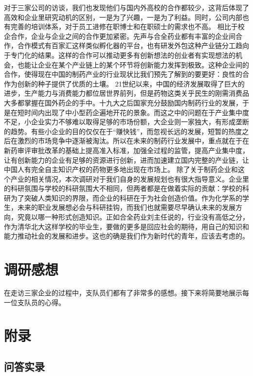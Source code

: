 \documentclass[twocolumn,openany]{ctexbook}
\begin{document}
	对于三家公司的访谈，我们也发现他们与国内外高校的合作都较少，这背后体现了高效和企业里研究动机的区别，一是为了兴趣，一是为了利益。同时，公司内部也有完善的培训体系，对于员工进修在职博士和在职硕士的需求也不高。
	相比于校企合作，企业与企业之间的合作更加紧密。先声与合全药业都有丰富的企业间合作，合作模式有百家汇这样类似孵化器的平台，也有研发外包这种产业链分工趋向于专门化的结果。这样的合作可以推动更多有创新想法的创业者有实现想法的机会，也能让企业在某个产业链上的某个环节将创新能力发挥到极致。这种企业间的合作，使得现在中国的制药产业的行业现状比我们预先了解到的要更好：良性的合作为创新的种子提供了优质的土壤。
	21世纪以来，中国的经济发展取得了巨大的进步，生产能力与消费能力都位居世界前列\citep{RN38}，但是药物这类关乎民生的刚需消费品大多都掌握在国外药企的手中。十九大之后国家充分鼓励国内制药行业的发展\citep{RN38}，于是在短时间内出现了中小型药企遍地开花的景象。而这之中的问题在于产业集中度不足，小企业实力不够难以取得足够的市场份额，大企业则一家独大，有形成垄断的趋势。有些小企业的目的仅仅在于“赚快钱”，而忽视长远的发展，短暂的热度之后在激烈的市场竞争中逐渐被淘汰。所以在未来的制药行业发展中，重点就在于在新药审评审批改革的基础上提高准入标准，加强全过程的监管，提高产业集中度，让有创新能力的企业有足够的资源进行创新，进而加速建立国内完整的产业链，让中国人有完全自主知识产权的药物更多地出现在市场上。
	除了关于制药企业和这个产业的相关情况，本次调研对于我们自身的发展规划也有很大指导意义。企业里的科研氛围与学校的科研氛围大不相同，但两者都是在做着实际的贡献：学校的科研为了突破人类知识的界限，而企业的科研在于为社会创造价值。作为化学系的学生，未来的职业发展想必会与科研挂钩，而我们也就需要尽早确认未来的发展方向，究竟以哪一种形式创造知识。正如合全药业刘主任说的，行业没有高低之分，作为清华北大这样学校的毕业生，要做的更多是回应社会的期待，用自己的知识和能力推动社会的发展和进步。这也的确是我们作为新时代的青年，应该去考虑的。
	
\onecolumn
\backmatter
	
	
\chapter{调研感想}
	在走访三家企业的过程中，支队员们都有了非常多的感想。接下来将简要地展示每一位支队员的心得。
	
	

\chapter{附录}

	\section*{问答实录}
\end{document}
